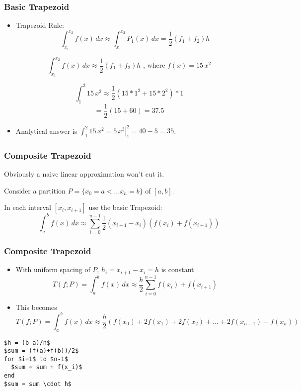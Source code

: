 \documentclass[10pt]{beamer}
\begin{document}
\begin{frame}
\frametitle{Basic Trapezoid}
\begin{itemize}
\item Trapezoid Rule:  \[\int_{x_1}^{x_2} f(x) \, dx \approx \int_{x_1}^{x_2} P_1(x)\,dx = \frac{1}{2}(f_1+f_2)h\]
\end{itemize}
 \[\int_{x_1}^{x_2} f(x) \, dx  \approx \frac{1}{2}(f_1+f_2)h \mbox{ , where } f(x) = 15\,x^2\]
\begin{example}
\[\int_{1}^{2} 15\,x^2 \approx \frac{1}{2}(15*1^2 + 15*2^2)*1\]
\[= \frac{1}{2}(15+60) = 37.5\]
\end{example}
\begin{itemize}
\item Analytical answer is $\int_{1}^{2} 15\,x^2 = \left. 5\,x^3 \right|_1^2  = 40 - 5 = 35$.
\end{itemize}
\end{frame}
\begin{frame}
\frametitle{Composite Trapezoid}
Obviously a naive linear approximation won't cut it.
\bigskip

Consider a partition $P=\{x_0=a< \dots x_n = b\}$ of $[a,b]$.
\bigskip

In each interval $[x_i,x_{i+1}]$ use the basic Trapezoid:
\begin{equation*}
  \int_a^b f(x)\,dx \approx \sum_{i=0}^{n-1}
\frac{1}{2}(x_{i+1}-x_{i})(f(x_i)+f(x_{i+1}))
\end{equation*}

\begin{center}
\qquad
\end{center}

\end{frame}
\begin{frame}[fragile]
\frametitle{Composite Trapezoid}
\begin{itemize}
  \item With uniform spacing of $P$, $h_i=x_{i+1}-x_{i}=h$ is constant
\begin{equation*}
T(f;P) = \int_a^b f(x)\,dx \approx \frac{h}{2}\sum_{i=0}^{n-1}f(x_i)+f(x_{i+1})
\end{equation*}
  \item This becomes
\begin{equation*}
T(f;P) = \int_a^b f(x)\,dx \approx \frac{h}{2}\left(f(x_0) + 2 f(x_1) +
2f(x_2) + \dots + 2 f(x_{n-1}) + f(x_n)\right)
\end{equation*}
\end{itemize}
\begin{lstlisting}[mathescape]
$h = (b-a)/n$
$sum = (f(a)+f(b))/2$
for $i=1$ to $n-1$
  $sum = sum + f(x_i)$
end
$sum = sum \cdot h$
\end{lstlisting}
\end{frame}
\end{document}
